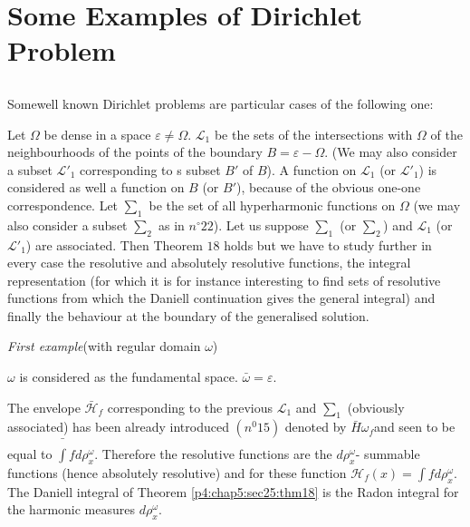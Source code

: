 \chapter{Some Examples of Dirichlet Problem}\label{p4:chap6}%

\setcounter{section}{25}
\section{}\label{p4:chap6:sec26}%

Some\pageoriginale well known Dirichlet problems are particular cases of the
following one: 

Let $\Omega$ be dense in a space $\varepsilon \neq
\Omega$. $\mathscr{L}_1$ be the sets of the intersections with
$\Omega$ of the neighbourhoods of the points of the boundary $B=
\varepsilon - \Omega$. (We may also consider a subset $\mathscr{L}'_1$
corresponding to s subset $B'$ of $B$). A function on $\mathscr{L}_1$
(or $\mathscr{L}'_1$) is considered as well a function on $B$ (or
$B'$), because of the obvious one-one correspondence. Let $\sum_1$ be
the set of all hyperharmonic functions on $\Omega$ (we may also
consider a subset $\sum_2$ as in $n^\circ 22$). Let us suppose $\sum_1$
(or $\sum_2$) and $\mathscr{L}_1$ (or $\mathscr{L}'_1$) are
associated. Then Theorem $18$ holds but we have to study further in
every case the resolutive and absolutely resolutive functions, the
integral representation (for which it is for instance interesting to
find sets of resolutive functions from which the Daniell continuation
gives the general integral) and finally the behaviour at the boundary
of the generalised solution.  

\noindent
\textit{First example}(with regular domain $\omega$)

\begin{prop}\label{p4:chap6:sec26:prop:16}%
  $\omega$ is considered as the fundamental space. $\bar{\omega}=\varepsilon$.
\end{prop}

The envelope $\bar{\mathscr{H}}_f$ corresponding to the previous
$\mathscr{L}_1$ and $\sum_1$ (obviously associated) has been already
introduced $(n^0 15)$ denoted by $\bar{H}\omega_f$\pageoriginale and seen to be
equal to $\bar{\int} f d \rho^\omega_x$. Therefore the resolutive
functions are the $d \rho^\omega_x$- summable functions (hence
absolutely resolutive) and for these function $\mathscr{H}_f (x) =
\int f d \rho^\omega_x$. The Daniell integral of Theorem
\ref{p4:chap5:sec25:thm18} is the Radon integral for the harmonic
measures $d \rho^\omega_x$.  


